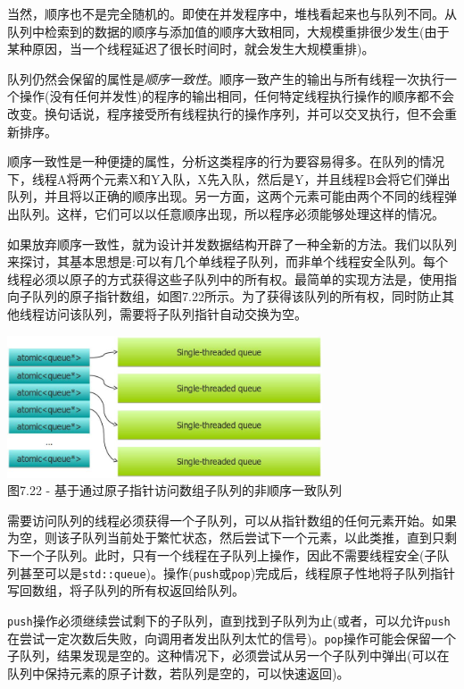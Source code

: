 当然，顺序也不是完全随机的。即使在并发程序中，堆栈看起来也与队列不同。从队列中检索到的数据的顺序与添加值的顺序大致相同，大规模重排很少发生(由于某种原因，当一个线程延迟了很长时间时，就会发生大规模重排)。

队列仍然会保留的属性是\textit{顺序一致性}。顺序一致产生的输出与所有线程一次执行一个操作(没有任何并发性)的程序的输出相同，任何特定线程执行操作的顺序都不会改变。换句话说，程序接受所有线程执行的操作序列，并可以交叉执行，但不会重新排序。

顺序一致性是一种便捷的属性，分析这类程序的行为要容易得多。在队列的情况下，线程A将两个元素X和Y入队，X先入队，然后是Y，并且线程B会将它们弹出队列，并且将以正确的顺序出现。另一方面，这两个元素可能由两个不同的线程弹出队列。这样，它们可以以任意顺序出现，所以程序必须能够处理这样的情况。

如果放弃顺序一致性，就为设计并发数据结构开辟了一种全新的方法。我们以队列来探讨，其基本思想是:可以有几个单线程子队列，而非单个线程安全队列。每个线程必须以原子的方式获得这些子队列中的所有权。最简单的实现方法是，使用指向子队列的原子指针数组，如图7.22所示。为了获得该队列的所有权，同时防止其他线程访问该队列，需要将子队列指针自动交换为空。

\begin{center}
\includegraphics[width=0.7\textwidth]{content/2/chapter7/images/22.jpg}\\
图7.22 - 基于通过原子指针访问数组子队列的非顺序一致队列
\end{center}

需要访问队列的线程必须获得一个子队列，可以从指针数组的任何元素开始。如果为空，则该子队列当前处于繁忙状态，然后尝试下一个元素，以此类推，直到只剩下一个子队列。此时，只有一个线程在子队列上操作，因此不需要线程安全(子队列甚至可以是\texttt{std::queue})。操作(\texttt{push}或\texttt{pop})完成后，线程原子性地将子队列指针写回数组，将子队列的所有权返回给队列。

\texttt{push}操作必须继续尝试剩下的子队列，直到找到子队列为止(或者，可以允许\texttt{push}在尝试一定次数后失败，向调用者发出队列太忙的信号)。\texttt{pop}操作可能会保留一个子队列，结果发现是空的。这种情况下，必须尝试从另一个子队列中弹出(可以在队列中保持元素的原子计数，若队列是空的，可以快速返回)。

